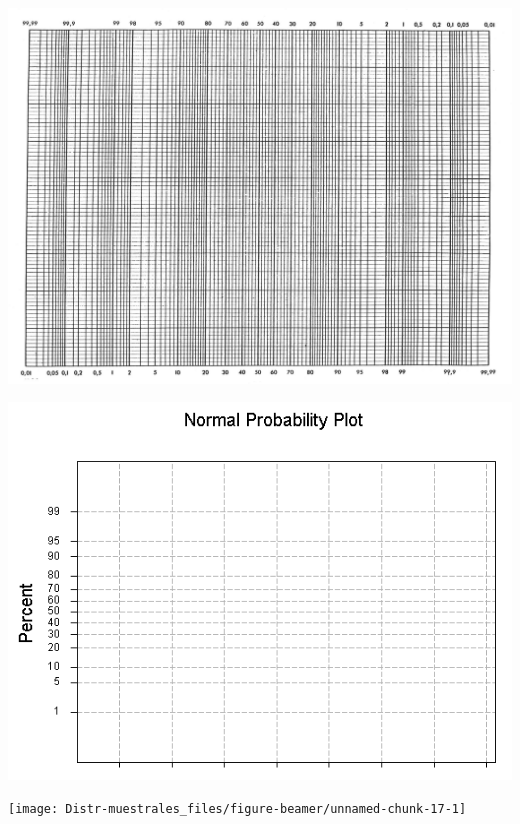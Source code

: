 \documentclass[
  10pt,
  ignorenonframetext,
]{beamer}
\begin{document}
\begin{frame}{}
\protect\hypertarget{section-40}{}
\includegraphics{figuras/probpaperLandscape.png}
\end{frame}

\begin{frame}{}
\protect\hypertarget{section-41}{}
\includegraphics[width=2\textwidth,height=\textheight]{figuras/probpaperLandscape2.png}
\end{frame}

\begin{frame}{}
\protect\hypertarget{section-42}{}
\begin{center}\texttt{[image: Distr-muestrales\_files/figure-beamer/unnamed-chunk-17-1]} \end{center}
\end{frame}
\end{document}
